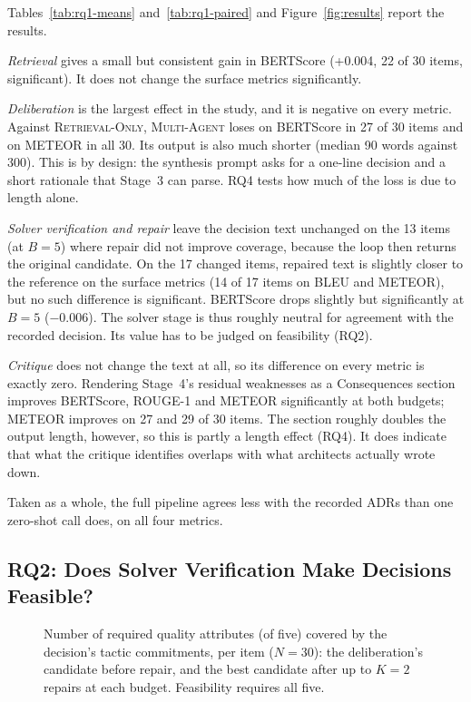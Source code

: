 \documentclass[preprint,12pt,authoryear]{elsarticle}
\newcommand{\sysRO}{\textsc{Retrieval-Only}}
\newcommand{\sysMA}{\textsc{Multi-Agent}}
\renewcommand{\_}{\textunderscore\allowbreak{}}
\begin{document}
Tables~\ref{tab:rq1-means} and~\ref{tab:rq1-paired} and Figure~\ref{fig:results} report the results.

\emph{Retrieval} gives a small but consistent gain in BERTScore (+0.004, 22 of 30 items, significant). It does not change the surface metrics significantly.

\emph{Deliberation} is the largest effect in the study, and it is negative on every metric. Against \sysRO{}, \sysMA{} loses on BERTScore in 27 of 30 items and on METEOR in all 30. Its output is also much shorter (median 90 words against 300). This is by design: the synthesis prompt asks for a one-line decision and a short rationale that Stage~3 can parse. RQ4 tests how much of the loss is due to length alone.

\emph{Solver verification and repair} leave the decision text unchanged on the 13 items (at $B=5$) where repair did not improve coverage, because the loop then returns the original candidate. On the 17 changed items, repaired text is slightly closer to the reference on the surface metrics (14 of 17 items on BLEU and METEOR), but no such difference is significant. BERTScore drops slightly but significantly at $B=5$ ($-0.006$). The solver stage is thus roughly neutral for agreement with the recorded decision. Its value has to be judged on feasibility (RQ2).

\emph{Critique} does not change the text at all, so its difference on every metric is exactly zero. Rendering Stage~4's residual weaknesses as a Consequences section improves BERTScore, ROUGE-1 and METEOR significantly at both budgets; METEOR improves on 27 and 29 of 30 items. The section roughly doubles the output length, however, so this is partly a length effect (RQ4). It does indicate that what the critique identifies overlaps with what architects actually wrote down.

Taken as a whole, the full pipeline agrees less with the recorded ADRs than one zero-shot call does, on all four metrics.

\subsection{RQ2: Does Solver Verification Make Decisions Feasible?}
\label{sec:rq2}

\begin{figure}[!htbp]
\centering
{}
\caption{Number of required quality attributes (of five) covered by the decision's tactic commitments, per item ($N=30$): the deliberation's candidate before repair, and the best candidate after up to $K=2$ repairs at each budget. Feasibility requires all five.\label{fig:coverage}}
\end{figure}
\end{document}

